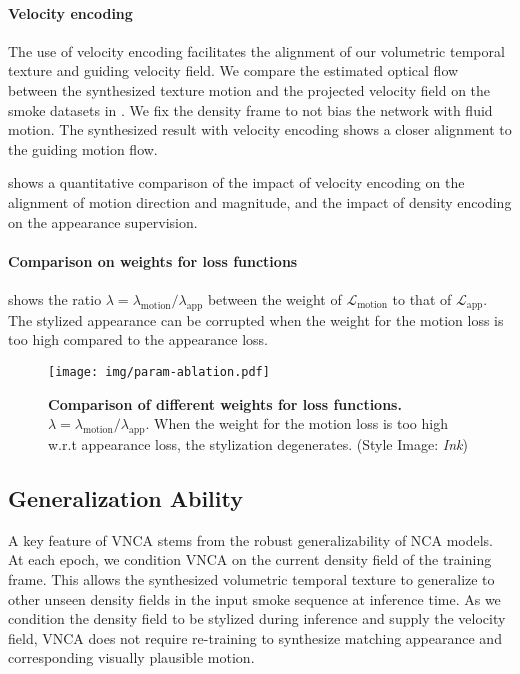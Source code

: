 \paragraph{Velocity encoding} 
The use of velocity encoding facilitates the alignment of our volumetric temporal texture and guiding velocity field. 
We compare the estimated optical flow between the synthesized texture motion and the projected velocity field on the smoke datasets in . 
We fix the density frame to not bias the network with fluid motion. 
The synthesized result with velocity encoding shows a closer alignment to the guiding motion flow. 

 shows a quantitative comparison of the impact of velocity encoding on the alignment of motion direction and magnitude, and the impact of density encoding on the appearance supervision. 


\paragraph{Comparison on weights for loss functions}  shows the ratio $\lambda = \lambda_\text{motion}/\lambda_\text{app}$ between the weight of $\mathcal{L}_\text{motion}$ to that of $\mathcal{L}_\text{app}$. 
The stylized appearance can be corrupted when the weight for the motion loss is too high compared to the appearance loss. 





\begin{figure}
  \centering
  \texttt{[image: img/param-ablation.pdf]}
  \caption{\textbf{Comparison of different weights for loss functions. } $\lambda = \lambda_\text{motion} / \lambda_\text{app}$. When the weight for the motion loss is too high w.r.t appearance loss, the stylization degenerates. (Style Image: \textit{Ink})  }
  \label{fig:param}
\end{figure}






\subsection{Generalization Ability}
\label{sec:gen}
A key feature of VNCA stems from the robust generalizability of NCA models. 
At each epoch, we condition VNCA on the current density field of the training frame. 
This allows the synthesized volumetric temporal texture to generalize to other unseen density fields in the input smoke sequence at inference time.
As we condition the density field to be stylized during inference and supply the velocity field, VNCA does not require re-training to synthesize matching appearance and corresponding visually plausible motion. 



